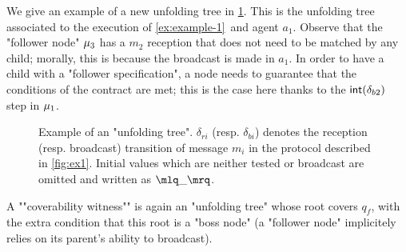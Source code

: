 \begin{example}
	We give an example of a new unfolding tree in \cref{fig:ex-unfolding-tree}. 
	This is the unfolding tree associated to the execution of \cref{ex:example-1}~and agent $a_1$. 
	Observe that the "follower node" $\mu_3$ has a $m_2$ reception that does not need to be matched by any child; morally, this is because the broadcast is made in $a_1$. 
	In order to have a child with a "follower specification", a node needs to guarantee that the conditions of the contract are met; 
	this is the case here thanks to the $\mathsf{int}(\delta_{b2})$ step in $\mu_1$.  
\end{example}
\begin{figure}[t]
	\begin{center}
					
		\end{center}
	\vspace*{-0.5cm}
	\caption{Example of an "unfolding tree". $\delta_{ri}$ (resp. $\delta_{bi}$) denotes the reception (resp. broadcast) transition of message $m_i$ in the protocol described in \cref{fig:ex1}. Initial values which are neither tested or broadcast are omitted and written as $\quotemarks{\_}$.}\label{fig:ex-unfolding-tree}
\end{figure}

A ""coverability witness"" is again an "unfolding tree" whose root covers $q_f$, with the extra condition that this root is a "boss node" (a "follower node" implicitely relies on its parent's ability to broadcast). 

